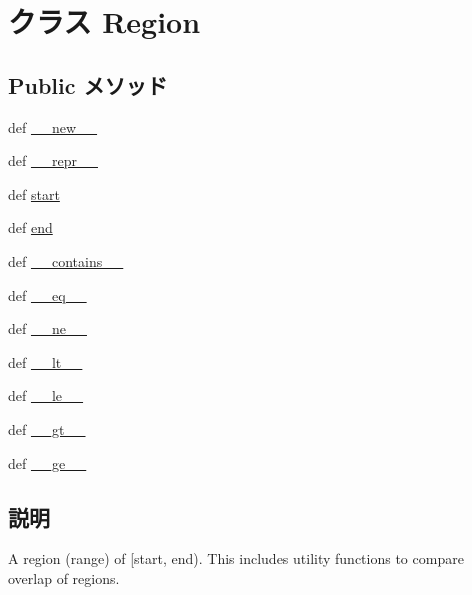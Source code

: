 \hypertarget{classm5_1_1util_1_1region_1_1Region}{
\section{クラス Region}
\label{classm5_1_1util_1_1region_1_1Region}
}
\subsection*{Public メソッド}
\begin{DoxyCompactItemize}
\item 
def \hyperlink{classm5_1_1util_1_1region_1_1Region_a2f15a4676204349e06bcced484b06b70}{\_\-\_\-new\_\-\_\-}
\item 
def \hyperlink{classm5_1_1util_1_1region_1_1Region_ad8b9328939df072e4740cd9a63189744}{\_\-\_\-repr\_\-\_\-}
\item 
def \hyperlink{classm5_1_1util_1_1region_1_1Region_a648d0fef4ece33dd7a8b9fc0d076cd9d}{start}
\item 
def \hyperlink{classm5_1_1util_1_1region_1_1Region_aefc410842cc3bef7453bb3da5eab212c}{end}
\item 
def \hyperlink{classm5_1_1util_1_1region_1_1Region_a31ecdf34e79a47aea99a17eea32b7ac2}{\_\-\_\-contains\_\-\_\-}
\item 
def \hyperlink{classm5_1_1util_1_1region_1_1Region_a449f8fd74d358c0ad641b6c6d6917ba0}{\_\-\_\-eq\_\-\_\-}
\item 
def \hyperlink{classm5_1_1util_1_1region_1_1Region_ad69df72a6bf0be3525fe45cd2f77f343}{\_\-\_\-ne\_\-\_\-}
\item 
def \hyperlink{classm5_1_1util_1_1region_1_1Region_a6a45920abc8ecf2d458d174ea7304f8a}{\_\-\_\-lt\_\-\_\-}
\item 
def \hyperlink{classm5_1_1util_1_1region_1_1Region_a83166e4aabc2805e71aef3a43f016181}{\_\-\_\-le\_\-\_\-}
\item 
def \hyperlink{classm5_1_1util_1_1region_1_1Region_a728aec3eafa75fd847ce0bf8f954efde}{\_\-\_\-gt\_\-\_\-}
\item 
def \hyperlink{classm5_1_1util_1_1region_1_1Region_a3ee81c22a31860655ba6bf83ff5a8f36}{\_\-\_\-ge\_\-\_\-}
\end{DoxyCompactItemize}


\subsection{説明}
\begin{DoxyVerb}A region (range) of [start, end).
This includes utility functions to compare overlap of regions.\end{DoxyVerb}
 


